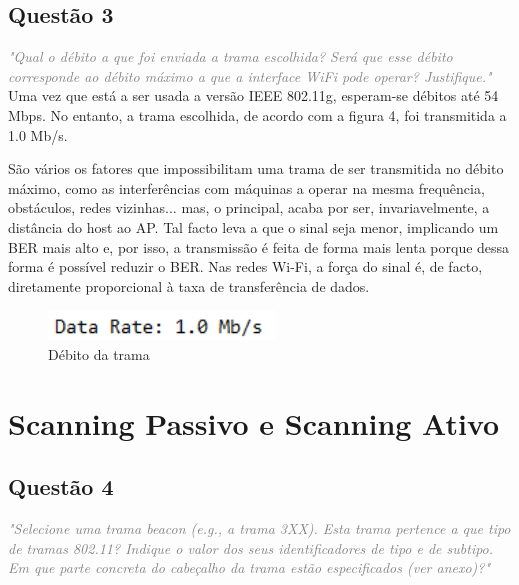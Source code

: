 \documentclass{llncs}
\newcommand{\questionE}[1]{\textcolor{gray}{\textit{"#1"}}}
\begin{document}
\subsection*{Questão 3}
\hspace{3mm} 
\questionE{Qual o débito a que foi enviada a trama escolhida? Será que esse débito corresponde ao débito máximo a que a interface WiFi pode operar? Justifique.}\\ 

Uma vez que está a ser usada a versão IEEE 802.11g, esperam-se débitos até 54 Mbps. No entanto, a trama escolhida, de acordo com a figura 4, foi transmitida a 1.0 Mb/s.

São vários os fatores que impossibilitam uma trama de ser transmitida no débito máximo, como as interferências com máquinas a operar na mesma frequência, obstáculos, redes vizinhas... mas, o principal, acaba por ser, invariavelmente, a distância do host ao AP. Tal facto leva a que o sinal seja menor, implicando um BER mais alto e, por isso, a transmissão é feita de forma mais lenta porque dessa forma é possível reduzir o BER. Nas redes Wi-Fi, a força do sinal é, de facto, diretamente proporcional à taxa de transferência de dados.

\begin{figure}[H]
\begin{center}
\includegraphics[width=6cm]{3.PNG}
\end{center}
\caption{Débito da trama}
\end{figure}

\clearpage

\section{Scanning Passivo e Scanning Ativo}

\subsection*{Questão 4}
\hspace{3mm} 
\questionE{Selecione uma trama beacon (e.g., a trama 3XX). Esta trama pertence a que tipo de tramas 802.11? Indique o valor dos seus identificadores de tipo e de subtipo. Em que parte concreta do cabeçalho da trama estão especificados (ver anexo)?}\\ 
\end{document}
